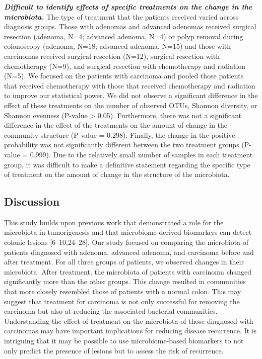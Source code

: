 \documentclass[12pt,]{article}
\begin{document}
\textbf{\emph{Difficult to identify effects of specific treatments on
the change in the microbiota.}} The type of treatment that the patients
received varied across diagnosis groups. Those with adenomas and
advanced adenomas received surgical resection (adenoma, N=4; advanced
adenoma, N=4) or polyp removal during colonoscopy (adenoma, N=18;
advanced adenoma, N=15) and those with carcinomas received surgical
resection (N=12), surgical resection with chemotherapy (N=9), and
surgical resection with chemotherapy and radiation (N=5). We focused on
the patients with carcinoma and pooled those patients that received
chemotherapy with those that received chemotherapy and radiation to
improve our statistical power. We did not observe a significant
difference in the effect of these treatments on the number of observed
OTUs, Shannon diversity, or Shannon evenness (P-value \textgreater{}
0.05). Furthermore, there was not a significant difference in the effect
of the treatments on the amount of change in the community structure
(P-value = 0.298). Finally, the change in the positive probability was
not significantly different between the two treatment groups (P-value =
0.999). Due to the relatively small number of samples in each treatment
group, it was difficult to make a definitive statement regarding the
specific type of treatment on the amount of change in the structure of
the microbiota.

\newpage

\subsection{Discussion}\label{discussion}

This study builds upon previous work that demonstrated a role for the
microbiota in tumorigenesis and that microbiome-derived biomarkers can
detect colonic lesions {[}6--10,24--28{]}. Our study focused on
comparing the microbiota of patients diagnosed with adenoma, advanced
adenoma, and carcinoma before and after treatment. For all three groups
of patients, we observed changes in their microbiota. After treatment,
the microbiota of patients with carcinoma changed significantly more
than the other groups. This change resulted in communities that more
closely resembled those of patients with a normal colon. This may
suggest that treatment for carcinoma is not only successful for removing
the carcinoma but also at reducing the associated bacterial communities.
Understanding the effect of treatment on the microbiota of those
diagnosed with carcinomas may have important implications for reducing
disease recurrence. It is intriguing that it may be possible to use
microbiome-based biomarkers to not only predict the presence of lesions
but to assess the risk of recurrence.
\end{document}
